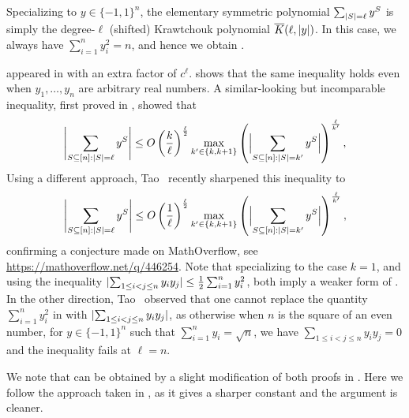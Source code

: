 \documentclass[10pt,a4paper]{article}
\theoremstyle{definition}
\newcommand{\ol}[1]{\overline{#1}}
\newcommand{\pmo}{\{-1,1\}}
\DeclarePairedDelimiter\abs{\lvert}{\rvert}
\def\sK{\ol{K}}
\begin{document}
Specializing to $y \in \pmo^n$, the elementary symmetric polynomial $\sum_{\abs{S}=\ell} y^S$ is simply the degree-$\ell$ (shifted) Krawtchouk polynomial $\sK(\ell,\abs{y})$.
In this case, we always have $\sum_{i=1}^n y_i^2 = n$, and hence we obtain .

 appeared in \cite{BIJLSV21}
with an extra factor of $c^\ell$.   shows that the same inequality holds even when $y_1, \ldots, y_n$ are arbitrary real numbers.
A similar-looking but incomparable inequality, first proved in \cite{GY20}, showed that
\begin{align} \label{eq:GY-ineq}
  \abs[\Bigg]{ \sum_{S \subseteq [n]: \abs{S}=\ell} y^S }
  \le O\left(\frac{k}{\ell}\right)^{\frac{\ell}{2}} \max_{k'\in\{k,k+1\}} \left(\abs[\Big]{\sum_{S \subseteq [n]: \abs{S}=k'} y^S } \right)^{\frac{\ell}{k'}} ,
\end{align}
Using a different approach, Tao~\cite{Tao23-Maclaurin} recently sharpened this inequality to
\begin{align} \label{eq:Tao-ineq}
  \abs[\Bigg]{ \sum_{S \subseteq [n]: \abs{S}=\ell} y^S }
\le O\left(\frac{1}{\ell}\right)^{\frac{\ell}{2}} \max_{k'\in\{k,k+1\}} \left(\abs[\Big]{\sum_{S \subseteq [n]: \abs{S}=k'} y^S } \right)^{\frac{\ell}{k'}} ,
\end{align}
confirming a conjecture made on MathOverflow, see \url{https://mathoverflow.net/q/446254}.
Note that specializing to the case $k=1$, and using the inequality $\abs{\sum_{1\le i < j \le n} y_i y_j} \le \frac{1}{2}\sum_{i=1}^n y_i^2$, both  imply a weaker form of .
In the other direction, Tao~\cite{Tao23-private} observed that one cannot replace the quantity $\sum_{i=1}^n y_i^2$ in  with $\abs{\sum_{1\le i < j \le n} y_i y_j}$, as otherwise when $n$ is the square of an even number, for $y \in \pmo^n$ such that $\sum_{i=1}^n y_i = \sqrt{n}$, we have $\sum_{1 \le i < j \le n} y_i y_j = 0$ and the inequality fails at $\ell = n$.

We note that  can be obtained by a slight modification of both proofs in \cite{GY20,Tao23-Maclaurin}.
Here we follow the approach taken in \cite{Tao23-Maclaurin}, as it gives a sharper constant and the argument is cleaner.
\end{document}
